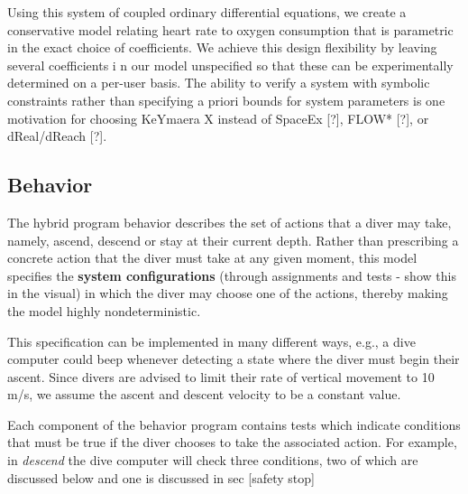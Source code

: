 \documentclass[sigconf,screen]{acmart}
\begin{document}
Using this system of coupled ordinary differential equations, we create a conservative model relating heart rate to oxygen consumption that is parametric in the exact choice of coefficients. We achieve this design flexibility by leaving several coefficients i
n our model unspecified so that these can be experimentally determined on a per-user basis. The ability to verify a system with symbolic constraints rather than specifying a priori bounds for system parameters is one motivation for choosing KeYmaera X instead of SpaceEx [?], FLOW* [?], or dReal/dReach [?].

\subsection{Behavior}
The hybrid program behavior describes the set of actions that a diver may take, namely, ascend, descend or stay at their current depth. Rather than prescribing a concrete action that the diver must take at any given moment, this model specifies the \textbf{system configurations} (through assignments and tests - show this in the visual) in which the diver may choose one of the actions, thereby making the model highly nondeterministic. 

This specification can be implemented in many different ways, e.g., a dive computer could beep whenever detecting a state where the diver must begin their ascent. Since divers are advised to limit their rate of vertical movement to 10 m/s, we assume the ascent and descent velocity to be a constant value. 

Each component of the behavior program contains tests which indicate conditions that must be true if the diver chooses to take the associated action. For example, in \textit{descend} the dive computer will check three conditions, two of which are discussed below and one is discussed in sec [safety stop]
\end{document}
